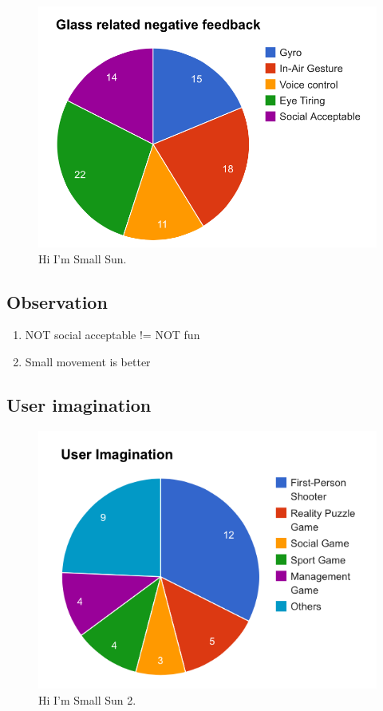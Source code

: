 \begin{figure}[!t]
\centering
\includegraphics[width=0.9\columnwidth]{Figures/US1_userfeedbackStatistics.png}
\caption{Hi I'm Small Sun.}
\label{fig:PS_Frus}
\end{figure}


\subsection{Observation}

\begin{enumerate}
\item NOT social acceptable != NOT fun
\item Small movement is better
\end{enumerate}


\subsection{User imagination}

\begin{figure}[!t]
\centering
\includegraphics[width=0.9\columnwidth]{Figures/US1_userImaginationStatistics.png}
\caption{Hi I'm Small Sun 2.}
\label{fig:PS_Frus}
\end{figure}

